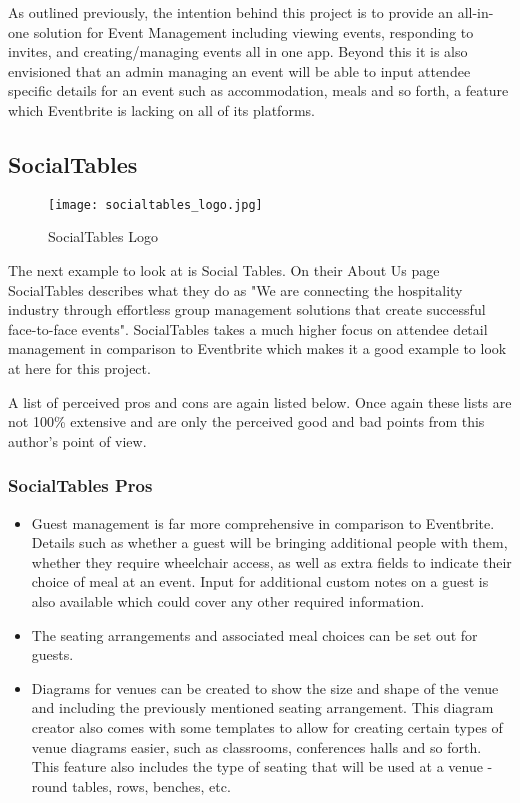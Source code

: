 As outlined previously, the intention behind this project is to provide an all-in-one solution for Event Management including viewing events, responding to invites, and creating/managing events all in one app. Beyond this it is also envisioned that an admin managing an event will be able to input attendee specific details for an event such as accommodation, meals and so forth, a feature which Eventbrite is lacking on all of its platforms.

\subsection{SocialTables}
\label{socialtablessection}

\begin{figure}[ht]
  \centering
      \texttt{[image: socialtables\_logo.jpg]}
  \caption[SocialTables Logo]{SocialTables Logo\cite{socialtableslogoresource}}
  \label{fig:socialtableslogo}
\end{figure}

The next example to look at is Social Tables. On their About Us page SocialTables describes what they do as "We are connecting the hospitality industry through effortless group management solutions that create successful face-to-face events"\cite{socialtablesaboutus}. SocialTables takes a much higher focus on attendee detail management in comparison to Eventbrite which makes it a good example to look at here for this project. 

A list of perceived pros and cons are again listed below. Once again these lists are not 100\% extensive and are only the perceived good and bad points from this author's point of view.

\subsubsection{SocialTables Pros}

\begin{itemize}
    \item Guest management is far more comprehensive in comparison to Eventbrite. Details such as whether a guest will be bringing additional people with them, whether they require wheelchair access, as well as extra fields to indicate their choice of meal at an event. Input for additional custom notes on a guest is also available which could cover any other required information.
    \item The seating arrangements and associated meal choices can be set out for guests.
    \item Diagrams for venues can be created to show the size and shape of the venue and including the previously mentioned seating arrangement. This diagram creator also comes with some templates to allow for creating certain types of venue diagrams easier, such as classrooms, conferences halls and so forth. This feature also includes the type of seating that will be used at a venue - round tables, rows, benches, etc.
\end{itemize}

